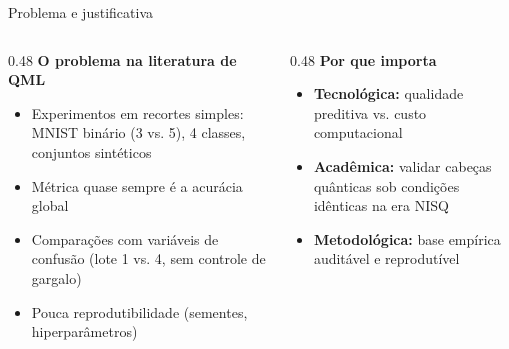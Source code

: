 \documentclass[aspectratio=169,11pt,brazil]{beamer}
\newcommand{\destaque}[1]{\textcolor{senacorange}{\textbf{#1}}}
\begin{document}
\begin{frame}{Problema e justificativa}
  \begin{columns}[T]
    \begin{column}{0.48\textwidth}
      \textbf{O problema na literatura de QML}
      \begin{itemize}
        \item Experimentos em recortes simples: MNIST binário (3 vs. 5), 4 classes, conjuntos sintéticos
        \item Métrica quase sempre é a acurácia global
        \item Comparações com variáveis de confusão (lote 1 vs. 4, sem controle de gargalo)
        \item Pouca reprodutibilidade (sementes, hiperparâmetros)
      \end{itemize}
    \end{column}
    \begin{column}{0.48\textwidth}
      \textbf{Por que importa}
      \begin{itemize}
        \item \destaque{Tecnológica:} qualidade preditiva vs. custo computacional
        \item \destaque{Acadêmica:} validar cabeças quânticas sob condições idênticas na era NISQ
        \item \destaque{Metodológica:} base empírica auditável e reprodutível
      \end{itemize}
    \end{column}
  \end{columns}
\end{frame}
\end{document}
